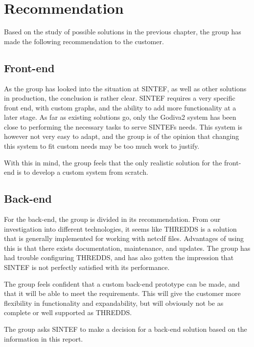 \documentclass[11pt,a4paper,titlepage,oneside]{report}
\begin{document}
\section{Recommendation}
Based on the study of possible solutions in the previous chapter, the group has made the following recommendation to the customer.

\subsection{Front-end}
As the group has looked into the situation at SINTEF, as well as other solutions in production, the conclusion is rather clear. SINTEF requires a very specific front end, with custom graphs, and the ability to add more functionality at a later stage. As far as existing solutions go, only the Godiva2 system has been close to performing the necessary tasks to serve SINTEFs needs. This system is however not very easy to adapt, and the group is of the opinion that changing this system to fit custom needs may be too much work to justify.

With this in mind, the group feels that the only realistic solution for the \gls{front-end} is to develop a custom system from scratch.

\subsection{Back-end}
For the \gls{back-end}, the group is divided in its recommendation. From our investigation into different technologies, it seems like \gls{THREDDS} is a solution that is generally implemented for working with \gls{netcdf} files. Advantages of using this is that there exists documentation, maintenance, and updates. The group has had trouble configuring \gls{THREDDS}, and has also gotten the impression that SINTEF is not perfectly satisfied with its performance. 

The group feels confident that a custom \gls{back-end} \gls{prototype} can be made, and that it will be able to meet the requirements. This will give the customer more flexibility in functionality and expandability, but will obviously not be as complete or well supported as \gls{THREDDS}.

The group asks SINTEF to make a decision for a \gls{back-end} solution based on the information in this report.
\end{document}

